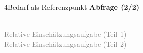 \documentclass[xcolor=table,9pt,aspectratio=169]{beamer}
\begin{document}
\begin{frame}{\vspace*{10mm}4\hspace*{1em}Bedarf als Referenzpunkt}
\textbf{Abfrage (2/2)}\\
\begin{multicols}{2}
   \begin{center}
      \\
      \textcolor{gray}{Relative Einschätzungsaufgabe (Teil 1)}
      \\
      \textcolor{gray}{Relative Einschätzungsaufgabe (Teil 2)}
   \end{center}
\end{multicols}
\end{frame}
\end{document}
